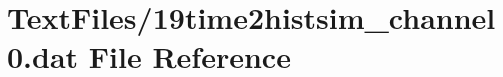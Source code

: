 \hypertarget{19time2histsim__channel0_8dat}{}\section{Text\+Files/19time2histsim\+\_\+channel0.dat File Reference}
\label{19time2histsim__channel0_8dat}
